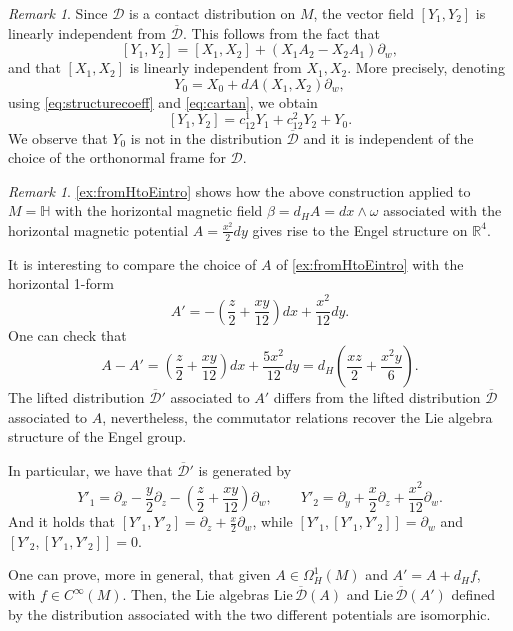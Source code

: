 \documentclass{amsart}
\theoremstyle{plain}
\theoremstyle{definition}
\theoremstyle{remark}
\newtheorem{remark}[thm]{Remark}
\newcommand{\R}{\mathbb{R}}
\newcommand{\diff}{d}%
\newcommand{\p}{\partial}												%
\newcommand{\distr}{\mathcal{D}}								%
\newcommand{\B}{\beta}
\newcommand{\lift}[1]{\overline{#1}} 							%
\begin{document}
\begin{remark} 
\label{rem:independenceofY_0}
Since $\distr$ is a contact distribution on $M$, the vector field $[Y_1,Y_2]$ is linearly independent from $\lift \distr$. This follows from the fact that
$$[Y_1,Y_2]=[X_1,X_2]+\left(X_1A_2-X_2A_1\right)\p_w,$$
and that $[X_1,X_2]$ is linearly independent from $X_{1},X_{2}$. 
More precisely, denoting
\begin{equation}
\label{eq:Y0}
Y_0= X_0+\diff A(X_1,X_2)\p_w,
\end{equation}
using \eqref{eq:structurecoeff} and \eqref{eq:cartan}, we obtain
\begin{equation}
\label{eq:[Y1,Y2]}
[Y_1,Y_2]=c_{12}^{1}Y_{1}+c_{12}^{2}Y_{2}+Y_0.%
\end{equation}
We observe that $Y_0$ is not in the distribution $\lift \distr$ and it is independent of the choice of the orthonormal frame for $\distr$.
\end{remark}

\begin{remark}
\cref{ex:fromHtoEintro} shows how the above construction applied to $M=\mathbb H$ with the horizontal magnetic field $\B=\diff_{H}A=dx\wedge\omega$ associated with the horizontal magnetic potential $A=\frac{x^2}{2}dy$ gives rise to the Engel structure on $\R^4$.


It is interesting to compare the choice of $A$ of \cref{ex:fromHtoEintro} with the horizontal 1-form
\begin{equation}
	A'=-\left(\frac{z}{2}+\frac{xy}{12}\right)dx+\frac{x^2}{12}dy.
 \end{equation}
One can check that 
$$A-A'=\left(\frac{z}{2}+\frac{xy}{12}\right)dx+\frac{5x^2}{12}dy =\diff_H\left(\frac{xz}{2}+\frac{x^2y}{6}\right).$$ 
The lifted distribution $\lift \distr'$ associated to $A'$ differs from the lifted distribution $\lift\distr$ associated to $A$, nevertheless, the commutator relations recover the Lie algebra structure of the Engel group.

In particular, we have that $\lift \distr'$ is generated by
\begin{equation}
Y'_1%
		=\p_x-\dfrac{y}{2}\p _z-\left(\frac{z}{2}+\frac{xy}{12}\right)\p_w, 
\qquad
Y'_2%
		=\p _y+\dfrac{x}{2}\p _z+\frac{x^2}{12}\p_w.
\end{equation}
And it holds that $[Y'_1,Y'_2]=\p_z+\frac{x}{2}\p_w$, while $[Y'_1,[Y'_1,Y'_2]]=\p_w$ and $[Y'_2,[Y'_1,Y'_2]]=0$.
\end{remark} 
 One can prove, more in general, that given $A\in \Omega^{1}_{H}(M)$ and $A'=A+\diff_{H} f$, with $f\in C^\infty(M)$. 
Then, the Lie algebras $\mathrm{Lie}\,\lift \distr (A) $ and $\mathrm{Lie}\,\lift\distr(A')$ defined by the distribution associated with the two different potentials are isomorphic. 
\end{document}
